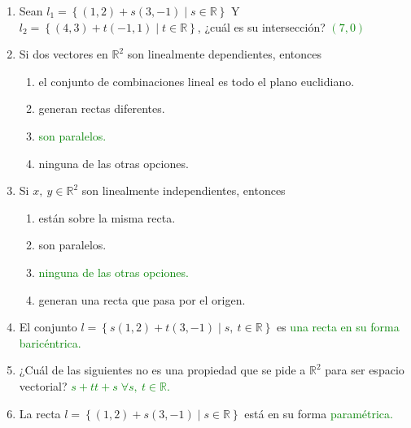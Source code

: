 \documentclass{article}
\theoremstyle{definicion}
\theoremstyle{definition}             %
\theoremstyle{definition}             %
\theoremstyle{definition}
\theoremstyle{definition}
\theoremstyle{observacion}
\theoremstyle{definition}
\theoremstyle{plain}
\theoremstyle{definition}
\theoremstyle{afirmacion}
\theoremstyle{notation}
\theoremstyle{definition}
\begin{document}
        \begin{enumerate}[label = Preg. \arabic*.]
            \item Sean \(l_{1} = \left\lbrace(1, 2) + s(3, -1) \mid s \in \mathbb{R}\right\rbrace\) Y \(l_{2} = \left\lbrace(4, 3) + t(-1, 1) \mid t \in \mathbb{R}\right\rbrace\), ¿cuál es su intersección? \textcolor{green}{\((7, 0)\)}

            \item Si dos vectores en \(\mathbb{R}^{2}\) son linealmente dependientes, entonces
            
            \begin{enumerate}[label = \alph*.]
                \item el conjunto de combinaciones lineal es todo el plano euclidiano.
                \item generan rectas diferentes.
                \item \textcolor{green}{son paralelos.}
                \item ninguna de las otras opciones.
            \end{enumerate}

            \item Si \(x,\ y \in \mathbb{R}^{2}\) son linealmente independientes, entonces
            
            \begin{enumerate}[label = \alph*.]
                \item están sobre la misma recta.
                \item son paralelos.
                \item \textcolor{green}{ninguna de las otras opciones.}
                \item generan una recta que pasa por el origen.
            \end{enumerate}

            \item El conjunto \(l = \left\lbrace s(1, 2) + t(3, -1) \mid s,\ t \in \mathbb{R}\right\rbrace\) es \textcolor{green}{una recta en su forma baricéntrica.}
            \item ¿Cuál de las siguientes no es una propiedad que se pide a \(\mathbb{R}^{2}\) para ser espacio vectorial? \textcolor{green}{\(s + t t + s\; \forall s,\ t \in \mathbb{R}\).}
            \item La recta \(l = \left\lbrace(1, 2) + s(3, -1) \mid s \in \mathbb{R}\right\rbrace\) está en su forma \textcolor{green}{paramétrica.}
        \end{enumerate}
\end{document}
